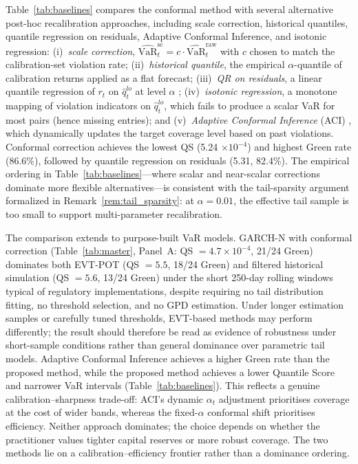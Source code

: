 \documentclass[preprint,11pt,authoryear]{elsarticle}
\newcommand{\VaR}{\mathrm{VaR}}
\newcommand{\1}{\boldsymbol{1}}
\begin{document}
	Table~\ref{tab:baselines} compares the conformal method with
	several alternative post-hoc recalibration approaches, including scale correction, historical quantiles, quantile regression on residuals, Adaptive Conformal Inference, and isotonic regression: (i)~\emph{scale correction},
	$\widehat{\VaR}_t^{\mathrm{sc}} = c \cdot
	\widehat{\VaR}_t^{\mathrm{raw}}$ with $c$ chosen to match the
	calibration-set violation rate; (ii)~\emph{historical quantile},
	the empirical $\alpha$-quantile of calibration returns applied
	as a flat forecast; (iii)~\emph{QR on residuals}, a linear
	quantile regression of $r_t$ on $\hat{q}_t^{lo}$ at level
	$\alpha$ \citep[cf.][]{romano2019conformalized};
	(iv)~\emph{isotonic regression}, a monotone mapping of
	violation indicators on $\hat{q}_t^{lo}$, which fails to
	produce a scalar VaR for most pairs (hence missing entries); and
	(v)~\emph{Adaptive Conformal Inference} (ACI) \citep{gibbs2021adaptive}, which dynamically updates the target coverage level based on past violations.
	Conformal correction achieves the lowest QS (5.24 $\times 10^{-4}$) and highest Green rate (86.6\%), followed by quantile regression on residuals (5.31, 82.4\%). The empirical ordering in Table~\ref{tab:baselines}---where scalar and near-scalar corrections dominate more flexible alternatives---is consistent with the tail-sparsity argument formalized in Remark~\ref{rem:tail_sparsity}: at $\alpha = 0.01$, the effective tail sample is too small to support multi-parameter recalibration.

	The comparison extends to purpose-built VaR models. GARCH-N with conformal correction (Table~\ref{tab:master}, Panel~A: QS $= 4.7 \times 10^{-4}$, 21/24 Green) dominates both EVT-POT (QS $= 5.5$, 18/24 Green) and filtered historical simulation (QS $= 5.6$, 13/24 Green) under the short 250-day rolling windows typical of regulatory implementations, despite requiring no tail distribution fitting, no threshold selection, and no GPD estimation. Under longer estimation samples or carefully tuned thresholds, EVT-based methods may perform differently; the result should therefore be read as evidence of robustness under short-sample conditions rather than general dominance over parametric tail models. Adaptive Conformal Inference \citep{gibbs2021adaptive} achieves a higher Green rate than the proposed method, while the proposed method achieves a lower Quantile Score and narrower VaR intervals (Table~\ref{tab:baselines}). This reflects a genuine calibration--sharpness trade-off: ACI's dynamic $\alpha_t$ adjustment prioritises coverage at the cost of wider bands, whereas the fixed-$\alpha$ conformal shift prioritises efficiency. Neither approach dominates; the choice depends on whether the practitioner values tighter capital reserves or more robust coverage. The two methods lie on a calibration--efficiency frontier rather than a dominance ordering.
\end{document}
